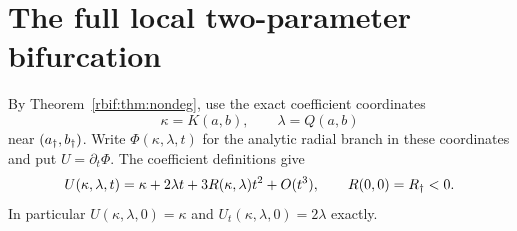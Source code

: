\section{The full local two-parameter bifurcation}
\label{rbif:sec:bifurcation}
By Theorem~\ref{rbif:thm:nondeg}, use the exact coefficient coordinates
\begin{equation}
 \kappa=K(a,b),\qquad \lambda=Q(a,b)
 \label{rbif:eq:coords}
\end{equation}
near $(a_\dagger,b_\dagger)$. Write $\Phi(\kappa,\lambda,t)$ for the analytic
radial branch in these coordinates and put $U=\partial_t\Phi$.
The coefficient definitions give
\begin{equation}
 U(\kappa,\lambda,t)=\kappa+2\lambda t
        +3R(\kappa,\lambda)t^2+O(t^3),\qquad
 R(0,0)=R_\dagger<0.
 \label{rbif:eq:U}
\end{equation}
In particular $U(\kappa,\lambda,0)=\kappa$ and
$U_t(\kappa,\lambda,0)=2\lambda$ exactly.

